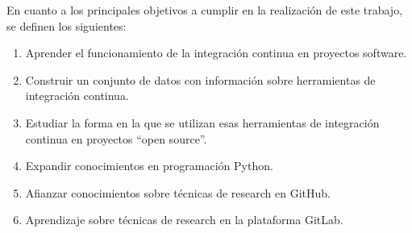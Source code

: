 En cuanto a los principales objetivos a cumplir en la realización de este trabajo, se definen los siguientes:
\begin{enumerate}
    \item Aprender el funcionamiento de la integración continua en proyectos software.
    \item Construir un conjunto de datos con información sobre herramientas de integración continua.
    \item Estudiar la forma en la que se utilizan esas herramientas de integración continua en proyectos ``open source''.
    \item Expandir conocimientos en programación Python.
    \item Afianzar conocimientos sobre técnicas de research en GitHub.
    \item Aprendizaje sobre técnicas de research en la plataforma GitLab.
\end{enumerate}